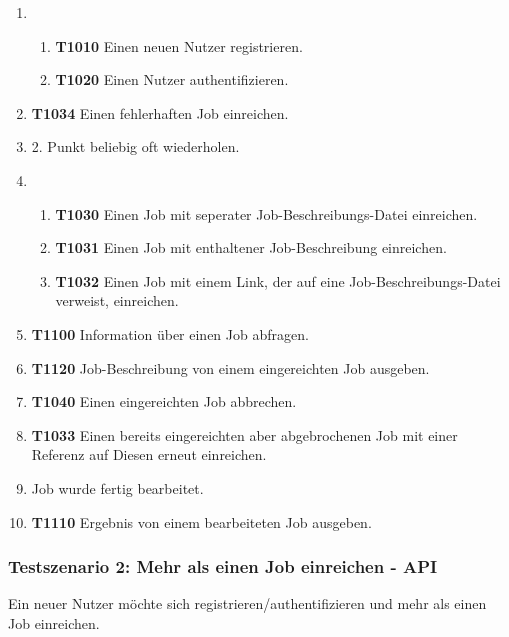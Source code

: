 \begin{enumerate}
    \item 
    \begin{enumerate}
        \item \textbf{T1010} Einen neuen Nutzer registrieren.
        
        \item \textbf{T1020} Einen Nutzer authentifizieren.
    \end{enumerate}
    
    \item \textbf{T1034} Einen fehlerhaften Job einreichen.
    
    \item 2. Punkt beliebig oft wiederholen.
    
    \item 
    \begin{enumerate}
        \item \textbf{T1030} Einen Job mit seperater Job-Beschreibungs-Datei einreichen. 
        
        \item \textbf{T1031} Einen Job mit enthaltener Job-Beschreibung einreichen.
        
        \item \textbf{T1032} Einen Job mit einem Link, der auf eine Job-Beschreibungs-Datei verweist, einreichen.
    \end{enumerate}
    
    \item \textbf{T1100} Information über einen Job abfragen.
    
    \item \textbf{T1120} Job-Beschreibung von einem eingereichten Job ausgeben.
    
    \item \textbf{T1040} Einen eingereichten Job abbrechen.
    
    \item \textbf{T1033} Einen bereits eingereichten aber abgebrochenen Job mit einer Referenz auf Diesen erneut einreichen.
    
    \item Job wurde fertig bearbeitet.
    
    \item \textbf{T1110} Ergebnis von einem bearbeiteten Job ausgeben. 
    
\end{enumerate}

\subsubsection{Testszenario 2: Mehr als einen Job einreichen - API}
Ein neuer Nutzer möchte sich registrieren/authentifizieren und mehr als einen Job einreichen.

